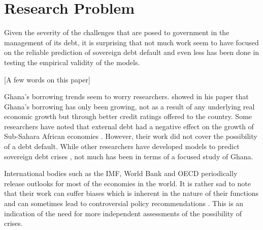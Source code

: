 \documentclass[a4paper, 12pt]{article}
\begin{document}
	
	\section{Research Problem}
	Given the severity of the challenges that are posed to government in the management of its debt, it is surprising that not much work seem to have focused on the reliable prediction of sovereign debt default  and even less has been done in testing the empirical validity of the models. 
	
	
	[A few words on this paper]\cite{Marku-2012}
	
	Ghana's borrowing trends seem to worry researchers.  showed in his paper that Ghana's borrowing has only been growing, not as a result of any underlying real economic growth but through better credit ratings offered to the country. Some researchers have noted that external debt had a negative effect on the growth of Sub-Sahara African economies \cite{Fiagbe2015, Shittu2018}. However, their work did not cover the possibility of a debt default. While other researchers have developed models to predict sovereign debt crises \cite{Marc-2008}, not much has been in terms of a focused study of Ghana.
	
	International bodies such as the IMF, World Bank and OECD periodically release outlooks for most of the economies in the world. It is rather sad to note that their work can suffer biases which is inherent in the nature of their functions \cite{Batchelor2001} and can sometimes lead to controversial policy recommendations \cite{nersisyan2010does}. This is an indication of the need for more independent assessments of the possibility of crises.
	
	
\end{document}
